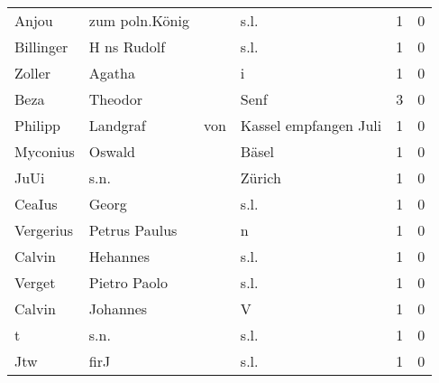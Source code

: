 \begin{center}
\begin{tiny}
\begin{longtabu}{llllrr}
                    Anjou &                     zum poln.König &             &                                        s.l. &          1 &         0 \\
                Billinger &                        H ns Rudolf &             &                                        s.l. &          1 &         0 \\
                   Zoller &                             Agatha &             &                                           i &          1 &         0 \\
                     Beza &                            Theodor &             &                                        Senf &          3 &         0 \\
                  Philipp &                           Landgraf &         von &                       Kassel empfangen Juli &          1 &         0 \\
                 Myconius &                             Oswald &             &                                       Bäsel &          1 &         0 \\
                     JuUi &                               s.n. &             &                                      Zürich &          1 &         0 \\
                   CeaIus &                              Georg &             &                                        s.l. &          1 &         0 \\
                Vergerius &                      Petrus Paulus &             &                                           n &          1 &         0 \\
                   Calvin &                           Hehannes &             &                                        s.l. &          1 &         0 \\
                   Verget &                       Pietro Paolo &             &                                        s.l. &          1 &         0 \\
                   Calvin &                           Johannes &             &                                           V &          1 &         0 \\
                        t &                               s.n. &             &                                        s.l. &          1 &         0 \\
                      Jtw &                               firJ &             &                                        s.l. &          1 &         0 \\

\end{longtabu}
\end{tiny}
\end{center}
